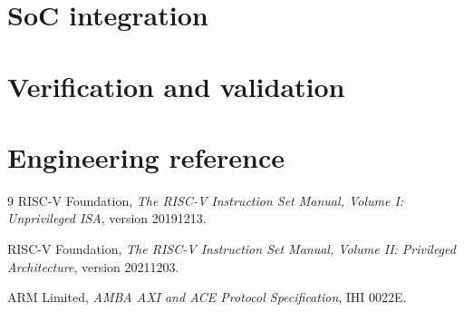\documentclass[11pt,openany]{report}
\begin{document}
\part{SoC integration}\label{part:integration}



\part{Verification and validation}\label{part:verif}



\part{Engineering reference}\label{part:reference}



\appendix





\begin{thebibliography}{9}
RISC-V Foundation, \emph{The RISC-V Instruction Set Manual, Volume I:
Unprivileged ISA}, version 20191213.

RISC-V Foundation, \emph{The RISC-V Instruction Set Manual, Volume II:
Privileged Architecture}, version 20211203.

ARM Limited, \emph{AMBA AXI and ACE Protocol Specification}, IHI 0022E.
\end{thebibliography}
\end{document}
